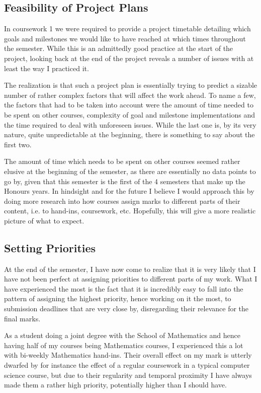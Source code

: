 \documentclass[11pt,a4paper,notitlepage]{article}
\begin{document}
\subsection{Feasibility of Project Plans}

    In coursework 1 we were required to provide a project timetable detailing which goals and milestones we would like to have reached at which times throughout the semester. While this is an admittedly good practice at the start of the project, looking back at the end of the project reveals a number of issues with at least the way I practiced it.

    The realization is that such a project plan is essentially trying to predict a sizable number of rather complex factors that will affect the work ahead. To name a few, the factors that had to be taken into account were the amount of time needed to be spent on other courses, complexity of goal and milestone implementations and the time required to deal with unforeseen issues. While the last one is, by its very nature, quite unpredictable at the beginning, there is something to say about the first two.

    The amount of time which needs to be spent on other courses seemed rather elusive at the beginning of the semester, as there are essentially no data points to go by, given that this semester is the first of the 4 semesters that make up the Honours years. In hindsight and for the future I believe I would approach this by doing more research into how courses assign marks to different parts of their content, i.e. to hand-ins, coursework, etc. Hopefully, this will give a more realistic picture of what to expect.

\subsection{Setting Priorities}

    At the end of the semester, I have now come to realize that it is very likely that I have not been perfect at assigning priorities to different parts of my work. What I have experienced the most is the fact that it is incredibly easy to fall into the pattern of assigning the highest priority, hence working on it the most, to submission deadlines that are very close by, disregarding their relevance for the final marks.

    As a student doing a joint degree with the School of Mathematics and hence having half of my courses being Mathematics courses, I experienced this a lot with bi-weekly Mathematics hand-ins. Their overall effect on my mark is utterly dwarfed by for instance the effect of a regular coursework in a typical computer science course, but due to their regularity and temporal proximity I have always made them a rather high priority, potentially higher than I should have.
\end{document}
